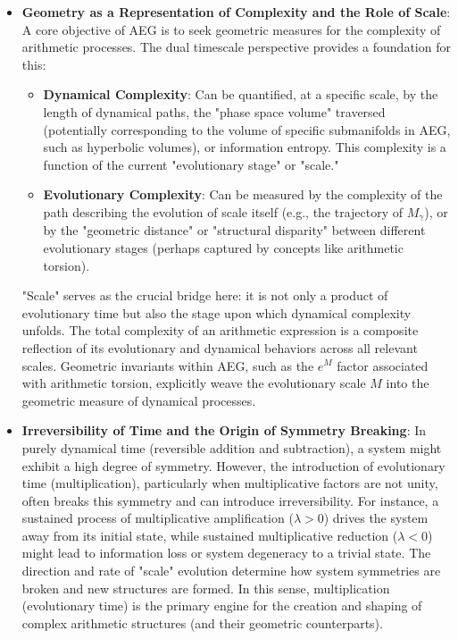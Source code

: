 \documentclass{article}
\begin{document}
\begin{itemize}
    \item \textbf{Geometry as a Representation of Complexity and the Role of Scale}:
    A core objective of AEG is to seek geometric measures for the complexity of arithmetic processes. The dual timescale perspective provides a foundation for this:
    \begin{itemize}
        \item \textbf{Dynamical Complexity}: Can be quantified, at a specific scale, by the length of dynamical paths, the "phase space volume" traversed (potentially corresponding to the volume of specific submanifolds in AEG, such as hyperbolic volumes), or information entropy. This complexity is a function of the current "evolutionary stage" or "scale."
        \item \textbf{Evolutionary Complexity}: Can be measured by the complexity of the path describing the evolution of scale itself (e.g., the trajectory of $M_\gamma$), or by the "geometric distance" or "structural disparity" between different evolutionary stages (perhaps captured by concepts like arithmetic torsion).
    \end{itemize}
    "Scale" serves as the crucial bridge here: it is not only a product of evolutionary time but also the stage upon which dynamical complexity unfolds. The total complexity of an arithmetic expression is a composite reflection of its evolutionary and dynamical behaviors across all relevant scales. Geometric invariants within AEG, such as the $e^M$ factor associated with arithmetic torsion, explicitly weave the evolutionary scale $M$ into the geometric measure of dynamical processes.

    \item \textbf{Irreversibility of Time and the Origin of Symmetry Breaking}:
    In purely dynamical time (reversible addition and subtraction), a system might exhibit a high degree of symmetry. However, the introduction of evolutionary time (multiplication), particularly when multiplicative factors are not unity, often breaks this symmetry and can introduce irreversibility. For instance, a sustained process of multiplicative amplification ($\lambda > 0$) drives the system away from its initial state, while sustained multiplicative reduction ($\lambda < 0$) might lead to information loss or system degeneracy to a trivial state.
    The direction and rate of "scale" evolution determine how system symmetries are broken and new structures are formed. In this sense, multiplication (evolutionary time) is the primary engine for the creation and shaping of complex arithmetic structures (and their geometric counterparts).
\end{itemize}
\end{document}
